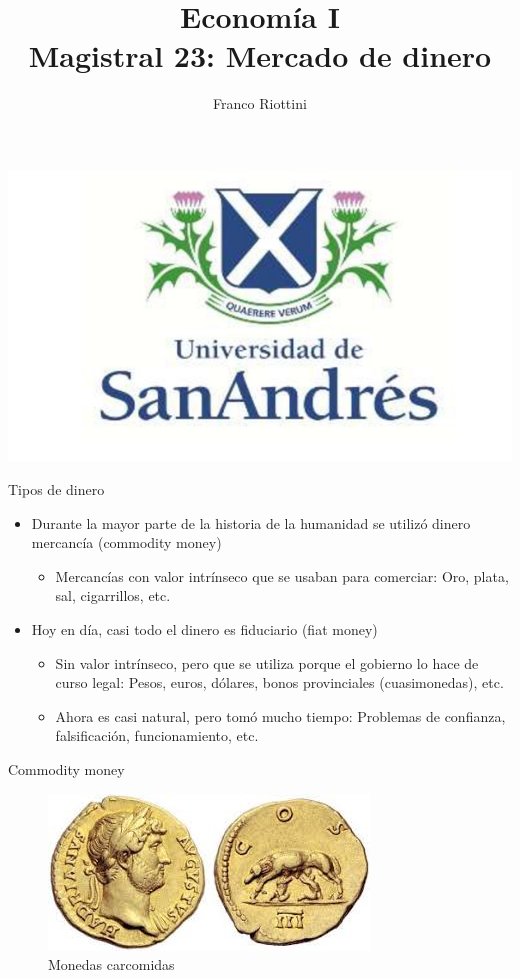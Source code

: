 \documentclass{beamer}
\title[Economía I]{Economía I \vspace{4mm}
\\ Magistral 23: Mercado de dinero}
\date{}
\author[Franco Riottini]{Franco Riottini}
\institute[]{Universidad de San Andrés}
\begin{document}
\begin{frame}
\titlepage
\centering
\includegraphics[scale=0.2]{../Figures/logoUDESA.jpg} 
\end{frame}

\begin{frame}{Tipos de dinero}
    \begin{itemize}
        \item Durante la mayor parte de la historia de la humanidad se utilizó dinero mercancía (commodity money)
            \begin{itemize}
                \item Mercancías con valor intrínseco que se usaban para comerciar: Oro, plata, sal, cigarrillos, etc.
            \end{itemize}
        \item Hoy en día, casi todo el dinero es fiduciario (fiat money)               
        \begin{itemize}
            \item Sin valor intrínseco, pero que se utiliza porque el gobierno lo hace de curso legal: Pesos, euros, dólares, bonos provinciales (cuasimonedas), etc.
            \item Ahora es casi natural, pero tomó mucho tiempo: Problemas de confianza, falsificación, funcionamiento, etc.
        \end{itemize}
    \end{itemize}
\end{frame}

\begin{frame}{Commodity money}
            \begin{figure} [H]   
  \centering
  \includegraphics[width=.8\textwidth]{../Figures/C32.1.jpg}
      \caption{Monedas carcomidas}
\end{figure}
\end{frame}
\end{document}

